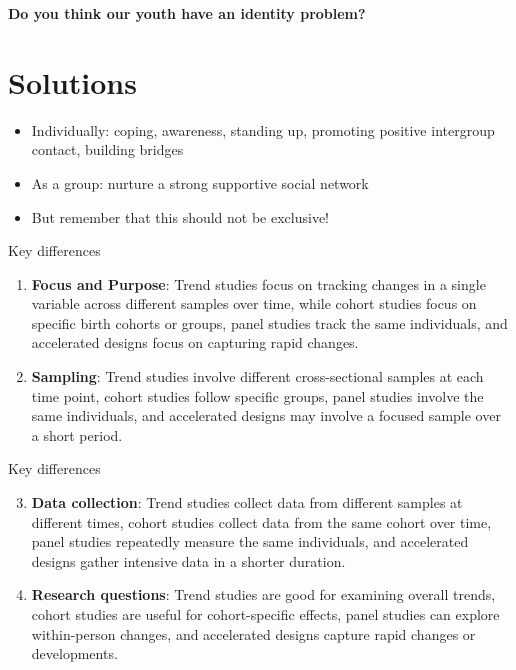 \documentclass[
  ignorenonframetext,
  aspectratio=169,
]{beamer}
\providecommand{\tightlist}{%
  \setlength{\itemsep}{0pt}\setlength{\parskip}{0pt}}\usepackage{longtable,booktabs,array}
\begin{document}
\begin{frame}
\textbf{Do you think our youth have an identity problem?}
\end{frame}

\section{Solutions}\label{solutions}

\begin{frame}
\begin{itemize}[<+->]
\tightlist
\item
  Individually: coping, awareness, standing up, promoting positive
  intergroup contact, building bridges
\item
  As a group: nurture a strong supportive social network
\item
  But remember that this should not be exclusive!
\end{itemize}
\end{frame}

\begin{frame}{Key differences}
\label{key-differences}
\begin{enumerate}[<+->]
\item
  \textbf{Focus and Purpose}: Trend studies focus on tracking changes in
  a single variable across different samples over time, while cohort
  studies focus on specific birth cohorts or groups, panel studies track
  the same individuals, and accelerated designs focus on capturing rapid
  changes.
\item
  \textbf{Sampling}: Trend studies involve different cross-sectional
  samples at each time point, cohort studies follow specific groups,
  panel studies involve the same individuals, and accelerated designs
  may involve a focused sample over a short period.
\end{enumerate}
\end{frame}

\begin{frame}{Key differences}
\label{key-differences-1}
\begin{enumerate}[<+->]
\setcounter{enumi}{2}
\item
  \textbf{Data collection}: Trend studies collect data from different
  samples at different times, cohort studies collect data from the same
  cohort over time, panel studies repeatedly measure the same
  individuals, and accelerated designs gather intensive data in a
  shorter duration.
\item
  \textbf{Research questions}: Trend studies are good for examining
  overall trends, cohort studies are useful for cohort-specific effects,
  panel studies can explore within-person changes, and accelerated
  designs capture rapid changes or developments.
\end{enumerate}
\end{frame}
\end{document}
